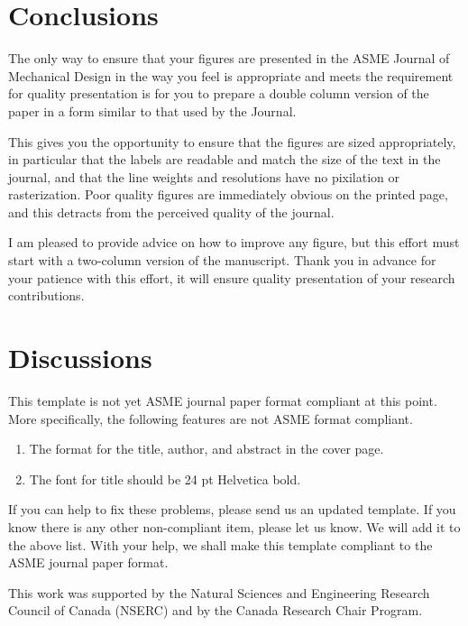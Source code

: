 \documentclass[twocolumn,10pt]{asme2ej}
\begin{document}
\section{Conclusions}
The only way to ensure that your figures are presented in the ASME Journal of Mechanical Design in the way you feel is appropriate and meets the requirement for quality presentation is for you to prepare a double column version of the paper in a form similar to that used by the Journal.

This gives you the opportunity to ensure that the figures are sized appropriately, in particular that the labels are readable and match the size of the text in the journal, and that the line weights and resolutions have no pixilation or rasterization.  Poor quality figures are immediately obvious on the printed page, and this detracts from the perceived quality of the journal.

I am pleased to provide advice on how to improve any figure, but this effort must start with a two-column version of the manuscript. Thank you in advance for your patience with this effort, it will ensure quality presentation of your research contributions.



\section{Discussions}
This template is not yet ASME journal paper format compliant at this point.
More specifically, the following features are not ASME format compliant.
\begin{enumerate}
\item
The format for the title, author, and abstract in the cover page.
\item
The font for title should be 24 pt Helvetica bold.
\end{enumerate}

\noindent
If you can help to fix these problems, please send us an updated template.
If you know there is any other non-compliant item, please let us know.
We will add it to the above list.
With your help, we shall make this template 
compliant to the ASME journal paper format.


\begin{acknowledgment}
This work was supported by the Natural Sciences and Engineering Research Council of Canada (NSERC) and by the
Canada Research Chair Program.
\end{acknowledgment}
\end{document}

